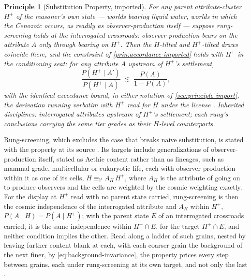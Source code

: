 \documentclass[11pt]{article}
\newtheorem{principle}{Principle}
\theoremstyle{definition}
\begin{document}
\begin{principle}[Substitution Property, imported]
\label{prin:substitution}
For any parent attribute-cluster $H^{+}$ of the reasoner's own state --- worlds bearing liquid water, worlds in which the Cenozoic occurs, as readily as observer-production itself --- suppose \emph{rung-screening} holds at the interrogated crossroads: observer-production bears on the attribute $A$ only through bearing on $H^{+}$. Then the $H$-tilted and $H^{+}$-tilted draws coincide there, and the constraint of \autoref{prin:accordance-imported} holds with $H^{+}$ in the conditioning seat: for any attribute $A$ upstream of $H^{+}$'s settlement,
\begin{equation}
\label{eq:substituted}
\frac{P(H^{+} \mid A')}{P(H^{+} \mid A)} \;\lesssim\; \frac{P(A)}{1 - P(A)},
\end{equation}
with the identical exceedance bound, in either notation of \autoref{sec:principle-import}, the derivation running verbatim with $H^{+}$ read for $H$ under the license \cite{Nexus}. Inherited disciplines: interrogated attributes upstream of $H^{+}$'s settlement; each rung's conclusions carrying the same tier grades as their $H$-level counterparts.
\end{principle}

Rung-screening, which excludes the case that breaks naive substitution, is stated with the property at its source \cite{NexicFoundation}. Its targets include generalizations of observer-production itself, stated as Aethic content rather than as lineages, such as mammal-grade, multicellular or eukaryotic life, each with observer-production within it as one of its cells, $H \equiv_{\mathcal{V}} A_{H}\,H^{+}$, where $A_{H}$ is the attribute of going on to produce observers and the cells are weighted by the cosmic weighting exactly. For the display at $H^{+}$ read with no parent state carried, rung-screening is then the cosmic independence of the interrogated attribute and $A_{H}$ within $H^{+}$, $P(A \mid H) = P(A \mid H^{+})$; with the parent state $E$ of an interrogated crossroads carried, it is the same independence within $H^{+} \cap E$, for the target $H^{+} \cap E$, and neither condition implies the other. Read along a ladder of such grains, nested by leaving further content blank at each, with each coarser grain the background of the next finer, by \eqref{eq:background-invariance}, the property prices every step between grains, each under rung-screening at its own target, and not only the last \cite{Nexus}.
\end{document}
